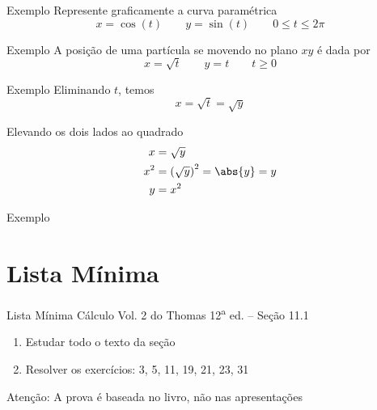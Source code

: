 \addtocounter{exemplo}{1}
\begin{frame}{Exemplo \theexemplo}
  Represente graficamente a curva paramétrica
  \[
    x = \cos(t)         \qquad
    y = \sin(t)         \qquad
    0 \leq t \leq 2\pi
  \]
\end{frame}


\addtocounter{exemplo}{1}
\begin{frame}{Exemplo \theexemplo}
  A posição de uma partícula se movendo no plano $xy$ é dada por
  \[
    x = \sqrt{t}  \qquad
    y = t         \qquad
    t \geq 0
  \]
\end{frame}

\begin{frame}{Exemplo \theexemplo}
  Eliminando $t$, temos
  \[
    x
    = \sqrt{t}
    = \sqrt{y}
  \]

  Elevando os dois lados ao quadrado
  \begin{align*}
    x   & = \sqrt{y}                \\
    x^2 & = \left(\sqrt{y}\right)^2
          = \abs{y}
          = y                       \\
    y   & = x^2
  \end{align*}
\end{frame}


\addtocounter{exemplo}{1}
\begin{frame}{Exemplo \theexemplo}
\end{frame}

\section{Lista Mínima}

\begin{frame}{Lista Mínima}
  Cálculo Vol. 2 do Thomas 12\textsuperscript{a} ed. -- Seção 11.1
  \begin{enumerate}
    \item Estudar todo o texto da seção
    \item Resolver os exercícios: 3, 5, 11, 19, 21, 23, 31
  \end{enumerate}
  \vfill
  Atenção: A prova é baseada no livro, não nas apresentações
\end{frame}

\begin{frame}
  \tableofcontents
\end{frame}


